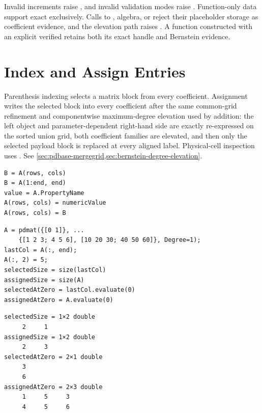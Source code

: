 \remarkshead
Invalid increments raise , and invalid validation modes raise . Function-only data support exact  exclusively. Calls to , algebra, or  reject their placeholder storage as coefficient evidence, and the elevation path raises . A function constructed with an explicit verified  retains both its exact handle and Bernstein evidence.

\section{\texorpdfstring{\hspace{0.5em}Index and Assign  Entries}{Index and Assign pdmat Entries}}
\label{sec:pdmat-indexing}

Parenthesis indexing selects a matrix block from every coefficient. Assignment writes the selected block into every coefficient after the same common-grid refinement and componentwise maximum-degree elevation used by addition: the left object and parameter-dependent right-hand side are exactly re-expressed on the sorted union grid, both coefficient families are elevated, and then only the selected payload block is replaced at every aligned label. Physical-cell inspection uses . See \cref{sec:pdbase-mergegrid,sec:bernstein-degree-elevation}.

\syntaxhead
\begin{lstlisting}[style=dpsyntax]
B = A(rows, cols)
B = A(1:end, end)
value = A.PropertyName
A(rows, cols) = numericValue
A(rows, cols) = B
\end{lstlisting}

\examplehead
\begin{lstlisting}[style=dpmatlab]
A = pdmat({[0 1]}, ...
    {[1 2 3; 4 5 6], [10 20 30; 40 50 60]}, Degree=1);
lastCol = A(:, end);
A(:, 2) = 5;
selectedSize = size(lastCol)
assignedSize = size(A)
selectedAtZero = lastCol.evaluate(0)
assignedAtZero = A.evaluate(0)
\end{lstlisting}

\begin{lstlisting}[style=dpoutput]
selectedSize = 1×2 double
     2     1
assignedSize = 1×2 double
     2     3
selectedAtZero = 2×1 double
     3
     6
assignedAtZero = 2×3 double
     1     5     3
     4     5     6
\end{lstlisting}

